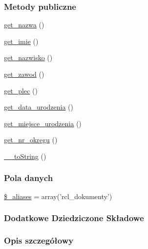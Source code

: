 \subsubsection*{Metody publiczne}
\begin{DoxyCompactItemize}
\item 
\hyperlink{classep___r_c_l___dokument_ac0818f0049d7b84f08f77128f54cee36}{get\-\_\-nazwa} ()
\item 
\hyperlink{classep___r_c_l___dokument_ac4b0c85dc2a130038f2d118dbd0c3d77}{get\-\_\-imie} ()
\item 
\hyperlink{classep___r_c_l___dokument_abdd1d7ff92508da7f748ba1feec97af0}{get\-\_\-nazwisko} ()
\item 
\hyperlink{classep___r_c_l___dokument_af80ca8310b60004454dd02a387deaa2c}{get\-\_\-zawod} ()
\item 
\hyperlink{classep___r_c_l___dokument_ac7f9af5c3fa024e4c26a7b6bd4ce4bb4}{get\-\_\-plec} ()
\item 
\hyperlink{classep___r_c_l___dokument_a880b240cd2d8c336fd1709bf0cb1ae2c}{get\-\_\-data\-\_\-urodzenia} ()
\item 
\hyperlink{classep___r_c_l___dokument_ac57c08ec5e394a19c5bd9280c8376182}{get\-\_\-miejsce\-\_\-urodzenia} ()
\item 
\hyperlink{classep___r_c_l___dokument_a2645a9f0aa5b0ccc482943348c033d0a}{get\-\_\-nr\-\_\-okregu} ()
\item 
\hyperlink{classep___r_c_l___dokument_a7516ca30af0db3cdbf9a7739b48ce91d}{\-\_\-\-\_\-to\-String} ()
\end{DoxyCompactItemize}
\subsubsection*{Pola danych}
\begin{DoxyCompactItemize}
\item 
\hyperlink{classep___r_c_l___dokument_ab4e31d75f0bc5d512456911e5d01366b}{\$\-\_\-aliases} = array('rcl\-\_\-dokumenty')
\end{DoxyCompactItemize}
\subsubsection*{Dodatkowe Dziedziczone Składowe}


\subsubsection{Opis szczegółowy}


